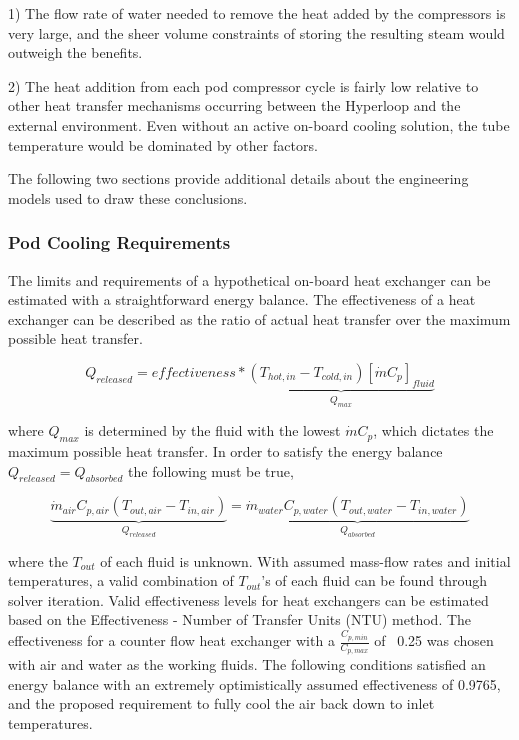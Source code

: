 \documentclass[heading.tex]{subfiles}
\begin{document}
1) The flow rate of water needed to remove the heat added by the compressors is very large, and the sheer volume constraints of storing
the resulting steam would outweigh the benefits.

2) The heat addition from each pod compressor cycle is fairly low relative to other heat transfer mechanisms occurring between the Hyperloop
and the external environment. Even without an active on-board cooling solution, the tube temperature would be dominated by other factors.

The following two sections provide additional details about the engineering models used to draw these conclusions.

\subsubsection{Pod Cooling Requirements}

The limits and requirements of a hypothetical on-board heat exchanger can be estimated with a straightforward energy balance. The
effectiveness of a heat exchanger can be described as the ratio of actual heat transfer over the maximum possible heat transfer.

\begin{equation}
{Q}_{released}  = effectiveness *\underbrace{\left(T_{hot,in} - T_{cold,in}\right) [ \dot{m} C_{p} ]_{fluid}}_\text{${Q}_{max}$}
\end{equation}


where ${Q}_{max}$ is determined by the fluid with the lowest $\dot{m} C_{p}$, which dictates the maximum possible heat transfer.
In order to satisfy the energy balance $Q_{released}=Q_{absorbed}$ the following must be true,

\begin{equation}
\underbrace{\dot{m}_{air} C_{p, air} (T_{out, air} - T_{in, air})}_{{Q}_{released}}  = \underbrace{\dot{m}_{water} C_{p,water} (T_{out, water} - T_{in, water})}_{{Q}_{absorbed}}
\end{equation}

where the $T_{out}$  of each fluid is unknown. With assumed mass-flow rates and initial temperatures, a valid combination of $T_{out}$'s of
each fluid can be found through solver iteration. Valid effectiveness levels for heat exchangers can be estimated based on the
Effectiveness - Number of Transfer Units (NTU) method. 
The effectiveness for a counter flow heat exchanger with a $\frac{C_{p,min}}{C_{p,max}}$ of ~0.25 was chosen with air and water as the working fluids. 
The following conditions satisfied an energy balance with an extremely optimistically assumed effectiveness of 0.9765,
and the proposed requirement to fully cool the air back down to inlet temperatures.
\end{document}
